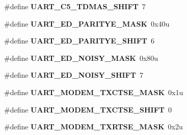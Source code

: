 \begin{DoxyCompactItemize}
\item 
\#define {\bfseries U\+A\+R\+T\+\_\+\+C5\+\_\+\+T\+D\+M\+A\+S\+\_\+\+S\+H\+I\+FT}~7\hypertarget{group__UART__Register__Masks_gadf4f03768249772994b3082c369698e7}{}\label{group__UART__Register__Masks_gadf4f03768249772994b3082c369698e7}

\item 
\#define {\bfseries U\+A\+R\+T\+\_\+\+E\+D\+\_\+\+P\+A\+R\+I\+T\+Y\+E\+\_\+\+M\+A\+SK}~0x40u\hypertarget{group__UART__Register__Masks_gad2d9046649263c73bfa0e64091c82d45}{}\label{group__UART__Register__Masks_gad2d9046649263c73bfa0e64091c82d45}

\item 
\#define {\bfseries U\+A\+R\+T\+\_\+\+E\+D\+\_\+\+P\+A\+R\+I\+T\+Y\+E\+\_\+\+S\+H\+I\+FT}~6\hypertarget{group__UART__Register__Masks_gaed5785f9e519dfa7936d82f4fedb8a83}{}\label{group__UART__Register__Masks_gaed5785f9e519dfa7936d82f4fedb8a83}

\item 
\#define {\bfseries U\+A\+R\+T\+\_\+\+E\+D\+\_\+\+N\+O\+I\+S\+Y\+\_\+\+M\+A\+SK}~0x80u\hypertarget{group__UART__Register__Masks_gab5ab58923c23cde1672fc9ae19053696}{}\label{group__UART__Register__Masks_gab5ab58923c23cde1672fc9ae19053696}

\item 
\#define {\bfseries U\+A\+R\+T\+\_\+\+E\+D\+\_\+\+N\+O\+I\+S\+Y\+\_\+\+S\+H\+I\+FT}~7\hypertarget{group__UART__Register__Masks_gab366fc1267a46213bc540e93c2603a6c}{}\label{group__UART__Register__Masks_gab366fc1267a46213bc540e93c2603a6c}

\item 
\#define {\bfseries U\+A\+R\+T\+\_\+\+M\+O\+D\+E\+M\+\_\+\+T\+X\+C\+T\+S\+E\+\_\+\+M\+A\+SK}~0x1u\hypertarget{group__UART__Register__Masks_ga00c7ea6d89eec98c2f6cc98651712c00}{}\label{group__UART__Register__Masks_ga00c7ea6d89eec98c2f6cc98651712c00}

\item 
\#define {\bfseries U\+A\+R\+T\+\_\+\+M\+O\+D\+E\+M\+\_\+\+T\+X\+C\+T\+S\+E\+\_\+\+S\+H\+I\+FT}~0\hypertarget{group__UART__Register__Masks_gafa34ecab8ca4ea8d72e3c42d846ce96d}{}\label{group__UART__Register__Masks_gafa34ecab8ca4ea8d72e3c42d846ce96d}

\item 
\#define {\bfseries U\+A\+R\+T\+\_\+\+M\+O\+D\+E\+M\+\_\+\+T\+X\+R\+T\+S\+E\+\_\+\+M\+A\+SK}~0x2u\hypertarget{group__UART__Register__Masks_gabcfa3a03c9114f74c35bb22c13261c1b}{}\label{group__UART__Register__Masks_gabcfa3a03c9114f74c35bb22c13261c1b}


\end{DoxyCompactItemize}
